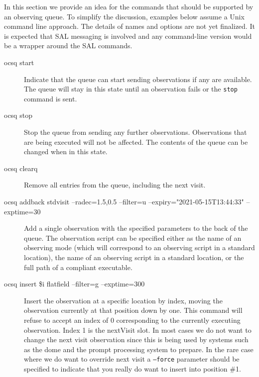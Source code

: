 \documentclass[TS,toc,lsstdraft]{lsstdoc}
\begin{document}
In this section we provide an idea for the commands that should be supported by an observing queue.
To simplify the discussion, examples below assume a Unix command line approach.
The details of names and options are not yet finalized.
It is expected that SAL messaging is involved and any command-line version would be a wrapper around the SAL commands.


\begin{description}

\item[ocsq start] \hfill

Indicate that the queue can start sending observations if any are available.
The queue will stay in this state until an observation fails or the \texttt{stop} command is sent.

\item[ocsq stop] \hfill

Stop the queue from sending any further observations.
Observations that are being executed will not be affected.
The contents of the queue can be changed when in this state.

\item[ocsq clearq] \hfill

Remove all entries from the queue, including the next visit.

\item[ocsq addback stdvisit --radec=1.5,0.5 --filter=u --expiry="2021-05-15T13:44:33" --exptime=30]

Add a single observation with the specified parameters to the back of the queue.
The observation script can be specified either as the name of an observing mode (which will correspond to an observing script in a standard location), the name of an observing script in a standard location, or the full path of a compliant executable.


\item[ocsq insert \$i flatfield --filter=g --exptime=300]

Insert the observation at a specific location by index, moving the observation currently at that position down by one.
This command will refuse to accept an index of 0 corresponding to the currently executing observation.
Index 1 is the nextVisit slot.
In most cases we do not want to change the next visit observation since this is being used by systems such as the dome and the prompt processing system to prepare.
In the rare case where we do want to override next visit a \texttt{--force} parameter should be specified to indicate that you really do want to insert into position \#1.


\end{description}
\end{document}
